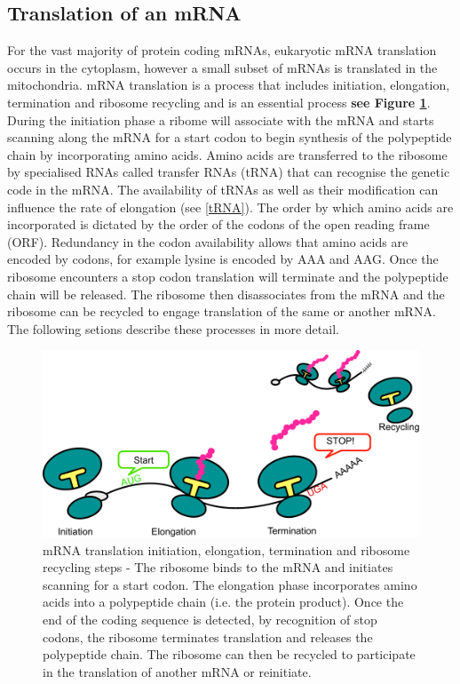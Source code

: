 \documentclass[12pt,openany]{book}
\begin{document}
\subsection{Translation of an mRNA} For the vast majority of protein
coding mRNAs, eukaryotic mRNA translation occurs in the cytoplasm,
however a small subset of mRNAs is translated in the mitochondria. mRNA
translation is a process that includes initiation, elongation,
termination and ribosome recycling and is an essential process
\textbf{see Figure \ref{fig:doodlemRNASteps}}. During the initiation
phase a ribome will associate with the mRNA and starts scanning along
the mRNA for a start codon to begin synthesis of the polypeptide chain
by incorporating amino acids. Amino acids are transferred to the
ribosome by specialised RNAs called transfer RNAs (tRNA) that can
recognise the genetic code in the mRNA. The availability of tRNAs as
well as their modification can influence the rate of elongation (see
\ref{tRNA}). The order by which amino acids are incorporated is dictated
by the order of the codons of the open reading frame (ORF). Redundancy
in the codon availability allows that amino acids are encoded by codons,
for example lysine is encoded by AAA and AAG. Once the ribosome
encounters a stop codon translation will terminate and the polypeptide
chain will be released. The ribosome then disassociates from the mRNA
and the ribosome can be recycled to engage translation of the same or
another mRNA. The following setions describe these processes in more
detail.

\begin{figure}
  \includegraphics{./figures/doodleTranslation.pdf}
  \caption{mRNA translation initiation, elongation, termination and ribosome recycling steps - The ribosome binds to the mRNA and initiates scanning for a start codon. The elongation phase incorporates amino acids into a polypeptide chain (i.e. the protein product). Once the end of the coding sequence is detected, by recognition of stop codons, the ribosome terminates translation and releases the polypeptide chain. The ribosome can then be recycled to participate in the translation of another mRNA or reinitiate. \label{fig:doodlemRNASteps}}
\end{figure}
\end{document}

